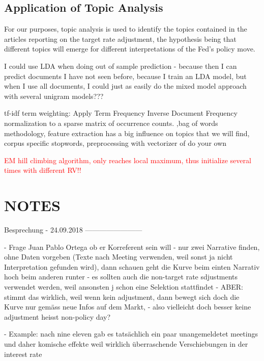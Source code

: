 \documentclass[11pt,a4paper,english,oneside]{book}
\numberwithin{equation}{chapter}
\begin{document}

\cite{SchofieldA.MagnussonM.&MimnoD..2017}

\subsection{Application of Topic Analysis}
For our purposes, topic analysis is used to identify the topics contained in the articles reporting on the target rate adjustment, the hypothesis being that different topics will emerge for different interpretations of the Fed's policy move. 

I could use LDA when doing out of sample prediction - because then I can predict documents I have not seen before, because I train an LDA model, but when I use all documents, I could just as easily do the mixed model approach with several unigram models???

tf-idf term weighting: Apply Term Frequency Inverse Document Frequency normalization to a sparse matrix of occurrence counts. ,bag of words methodology, feature extraction has a big influence on topics that we will find, corpus specific stopwords, preprocessing with vectorizer of do your own

\textcolor{red}{EM hill climbing algorithm, only reaches local maximum, thus initialize several times with different RV!! }

\section{NOTES}
Besprechung - 24.09.2018
------------------------

- Frage Juan Pablo Ortega ob er Korreferent sein will
- nur zwei Narrative finden, ohne Daten vorgeben (Texte nach Meeting verwenden, weil sonst ja nicht Interpretation gefunden wird), dann schauen geht die Kurve beim einten Narrativ hoch beim anderen runter
- es sollten auch die non-target rate sdjustments verwendet werden, weil ansonsten j schon eine Selektion stattfindet - ABER: stimmt das wirklich, weil wenn kein adjustment, dann bewegt sich doch die Kurve nur gemäss neue Infos auf dem Markt, - also vielleicht doch besser keine adjustment heisst non-policy day?

- Example: nach nine eleven gab es tatsächlich ein paar unangemeldetet meetings und daher komische effekte weil wirklich überraschende Verschiebungen in der interest rate
\end{document}
